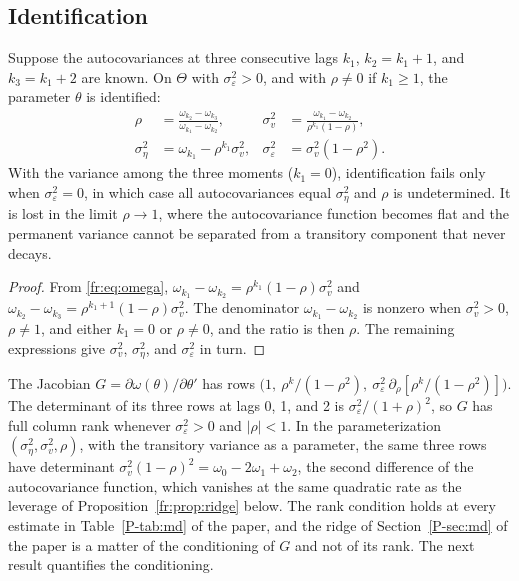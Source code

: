 \subsection{Identification}

\begin{proposition}
\label{fr:prop:ident}
Suppose the autocovariances at three consecutive lags $k_1$,
$k_2 = k_1 + 1$, and $k_3 = k_1 + 2$ are known. On $\Theta$ with
$\sigma^2_\varepsilon > 0$, and with $\rho \ne 0$ if $k_1 \ge 1$, the
parameter $\theta$ is identified:
\begin{equation}
\begin{aligned}
\rho &= \frac{\omega_{k_2} - \omega_{k_3}}{\omega_{k_1} - \omega_{k_2}}, &
\sigma^2_v &= \frac{\omega_{k_1} - \omega_{k_2}}{\rho^{k_1}(1 - \rho)}, \\
\sigma^2_\eta &= \omega_{k_1} - \rho^{k_1}\sigma^2_v, &
\sigma^2_\varepsilon &= \sigma^2_v(1-\rho^2).
\end{aligned}
\label{fr:eq:ident}
\end{equation}
With the variance among the three moments ($k_1 = 0$), identification
fails only when $\sigma^2_\varepsilon = 0$, in which case all
autocovariances equal $\sigma^2_\eta$ and $\rho$ is undetermined. It is
lost in the limit $\rho \to 1$, where the autocovariance function becomes
flat and the permanent variance cannot be separated from a transitory
component that never decays.
\end{proposition}

\begin{proof}
From \eqref{fr:eq:omega},
$\omega_{k_1} - \omega_{k_2} = \rho^{k_1}(1-\rho)\sigma^2_v$ and
$\omega_{k_2} - \omega_{k_3} = \rho^{k_1+1}(1-\rho)\sigma^2_v$. The
denominator $\omega_{k_1} - \omega_{k_2}$ is nonzero when
$\sigma^2_v > 0$, $\rho \ne 1$, and either $k_1 = 0$ or $\rho \ne 0$, and
the ratio is then $\rho$. The remaining expressions give $\sigma^2_v$,
$\sigma^2_\eta$, and $\sigma^2_\varepsilon$ in turn.
\end{proof}

The Jacobian $G = \partial\omega(\theta)/\partial\theta'$ has rows
$\big(1,\ \rho^k/(1-\rho^2),\ \sigma^2_\varepsilon\,\partial_\rho[\rho^k/(1-\rho^2)]\big)$.
The determinant of its three rows at lags 0, 1, and 2 is
$\sigma^2_\varepsilon/(1+\rho)^2$, so $G$ has full column rank whenever
$\sigma^2_\varepsilon > 0$ and $|\rho| < 1$. In the parameterization
$(\sigma^2_\eta, \sigma^2_v, \rho)$, with the transitory variance as a parameter, the same three rows have determinant
$\sigma^2_v(1-\rho)^2 = \omega_0 - 2\omega_1 + \omega_2$, the second
difference of the autocovariance function, which vanishes at the same
quadratic rate as the leverage of Proposition~\ref{fr:prop:ridge}
below. The rank condition holds at
every estimate in Table~\ref{P-tab:md} of the paper, and the ridge of
Section~\ref{P-sec:md} of the paper is a matter of the conditioning of $G$
and not of its rank. The next result quantifies the conditioning.

